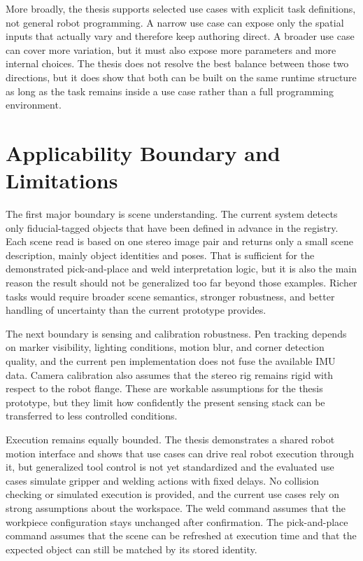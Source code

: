 More broadly, the thesis supports selected use cases with explicit task definitions, not general robot programming. A narrow use case can expose only the spatial inputs that actually vary and therefore keep authoring direct. A broader use case can cover more variation, but it must also expose more parameters and more internal choices. The thesis does not resolve the best balance between those two directions, but it does show that both can be built on the same runtime structure as long as the task remains inside a use case rather than a full programming environment.

\section{Applicability Boundary and Limitations}

The first major boundary is scene understanding. The current system detects only fiducial-tagged objects that have been defined in advance in the registry. Each scene read is based on one stereo image pair and returns only a small scene description, mainly object identities and poses. That is sufficient for the demonstrated pick-and-place and weld interpretation logic, but it is also the main reason the result should not be generalized too far beyond those examples. Richer tasks would require broader scene semantics, stronger robustness, and better handling of uncertainty than the current prototype provides.

The next boundary is sensing and calibration robustness. Pen tracking depends on marker visibility, lighting conditions, motion blur, and corner detection quality, and the current pen implementation does not fuse the available IMU data. Camera calibration also assumes that the stereo rig remains rigid with respect to the robot flange. These are workable assumptions for the thesis prototype, but they limit how confidently the present sensing stack can be transferred to less controlled conditions.

Execution remains equally bounded. The thesis demonstrates a shared robot motion interface and shows that use cases can drive real robot execution through it, but generalized tool control is not yet standardized and the evaluated use cases simulate gripper and welding actions with fixed delays. No collision checking or simulated execution is provided, and the current use cases rely on strong assumptions about the workspace. The weld command assumes that the workpiece configuration stays unchanged after confirmation. The pick-and-place command assumes that the scene can be refreshed at execution time and that the expected object can still be matched by its stored identity.

